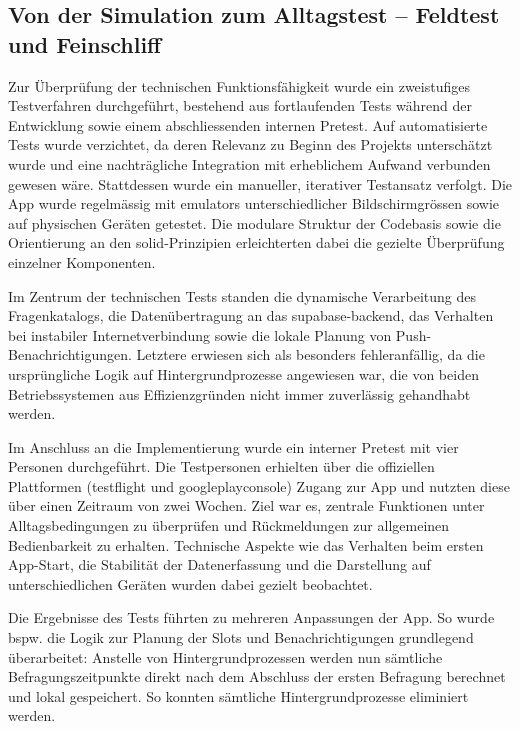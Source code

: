 \subsection{Von der Simulation zum Alltagstest – Feldtest und Feinschliff}
\label{sec:app_entwicklung_feldtest}

Zur Überprüfung der technischen Funktionsfähigkeit wurde ein zweistufiges Testverfahren durchgeführt, bestehend aus fortlaufenden Tests während der Entwicklung sowie einem abschliessenden internen Pretest. Auf automatisierte Tests wurde verzichtet, da deren Relevanz zu Beginn des Projekts unterschätzt wurde und eine nachträgliche Integration mit erheblichem Aufwand verbunden gewesen wäre. Stattdessen wurde ein manueller, iterativer Testansatz verfolgt. Die App wurde regelmässig mit \glspl{emulator} unterschiedlicher Bildschirmgrössen sowie auf physischen Geräten getestet. Die modulare Struktur der Codebasis sowie die Orientierung an den \gls{solid}-Prinzipien erleichterten dabei die gezielte Überprüfung einzelner Komponenten.

Im Zentrum der technischen Tests standen die dynamische Verarbeitung des Fragenkatalogs, die Datenübertragung an das \gls{supabase}-\gls{backend}, das Verhalten bei instabiler Internetverbindung sowie die lokale Planung von Push-Benachrichtigungen. Letztere erwiesen sich als besonders fehleranfällig, da die ursprüngliche Logik auf Hintergrundprozesse angewiesen war, die von beiden Betriebssystemen aus Effizienzgründen nicht immer zuverlässig gehandhabt werden.

Im Anschluss an die Implementierung wurde ein interner Pretest mit vier Personen durchgeführt. Die Testpersonen erhielten über die offiziellen Plattformen (\gls{testflight} und \gls{googleplayconsole}) Zugang zur App und nutzten diese über einen Zeitraum von zwei Wochen. Ziel war es, zentrale Funktionen unter Alltagsbedingungen zu überprüfen und Rückmeldungen zur allgemeinen Bedienbarkeit zu erhalten. Technische Aspekte wie das Verhalten beim ersten App-Start, die Stabilität der Datenerfassung und die Darstellung auf unterschiedlichen Geräten wurden dabei gezielt beobachtet.

Die Ergebnisse des Tests führten zu mehreren Anpassungen der App. So wurde bspw. die Logik zur Planung der Slots und Benachrichtigungen grundlegend überarbeitet: Anstelle von Hintergrundprozessen werden nun sämtliche Befragungszeitpunkte direkt nach dem Abschluss der ersten Befragung berechnet und lokal gespeichert. So konnten sämtliche Hintergrundprozesse eliminiert werden.

